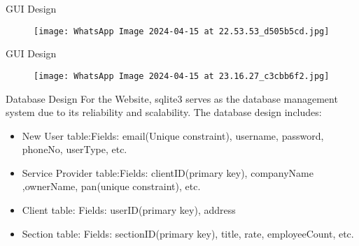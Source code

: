 \documentclass{beamer} %
\begin{document}
\begin{frame}{GUI Design}
    \vspace{5pt} %
    \begin{figure}
    
        \texttt{[image: WhatsApp Image 2024-04-15 at 22.53.53\_d505b5cd.jpg]}
    \end{figure}
    
\end{frame}

\begin{frame}{GUI Design}
    \vspace{5pt} %
    \begin{figure}
    
        \texttt{[image: WhatsApp Image 2024-04-15 at 23.16.27\_c3cbb6f2.jpg]}
    \end{figure}
    
\end{frame}

    
    

\begin{frame}{Database Design}
For the Website, sqlite3 serves as the database management system
due to its reliability and scalability. The database design includes:
    \vspace{5pt} %
    \begin{itemize}
        \item New User table:Fields: email(Unique constraint), username, password, phoneNo, userType, etc.
        \item Service Provider table:Fields: clientID(primary key), companyName ,ownerName, pan(unique constraint), etc.
        \item Client table: Fields: userID(primary key), address
        \item Section table: Fields: sectionID(primary key), title, rate, employeeCount, etc.
    \end{itemize}
    
\end{frame}
\end{document}
